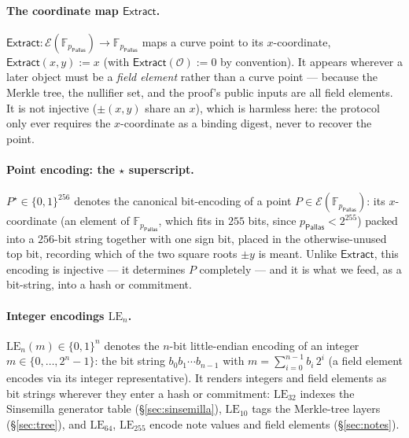 \documentclass[11pt,a4paper]{article}
\theoremstyle{definition}
\newcommand{\F}{\mathbb{F}}
\newcommand{\Pallas}{\ensuremath{\mathsf{Pallas}}}
\newcommand{\Ep}{\ensuremath{\mathcal{E}}}
\newcommand{\Extract}{\ensuremath{\mathsf{Extract}}}
\begin{document}
\paragraph{The coordinate map $\Extract$.}
$\Extract : \Ep(\F_{p_{\Pallas}}) \to \F_{p_{\Pallas}}$ maps a curve point
to its $x$-coordinate, $\Extract(x, y) := x$ (with
$\Extract(\mathcal{O}) := 0$ by convention). It appears wherever a later
object must be a \emph{field element} rather than a curve point --- because
the Merkle tree, the nullifier set, and the proof's public inputs are all
field elements. It is not injective ($\pm(x,y)$ share an $x$), which is
harmless here: the protocol only ever requires the $x$-coordinate as a binding
digest, never to recover the point.

\paragraph{Point encoding: the $\star$ superscript.}
$P^\star \in \{0,1\}^{256}$ denotes the canonical bit-encoding of a point
$P \in \Ep(\F_{p_{\Pallas}})$: its $x$-coordinate (an element of
$\F_{p_{\Pallas}}$, which fits in $255$ bits, since $p_{\Pallas} < 2^{255}$) packed
into a $256$-bit string together with one sign bit, placed in the otherwise-unused
top bit, recording which of the two square roots $\pm y$ is meant. Unlike $\Extract$,
this encoding is injective --- it determines $P$ completely --- and it is what
we feed, as a bit-string, into a hash or commitment.

\paragraph{Integer encodings $\mathrm{LE}_n$.}
$\mathrm{LE}_n(m) \in \{0,1\}^n$ denotes the $n$-bit little-endian encoding
of an integer $m \in \{0, \dots, 2^n - 1\}$: the bit string
$b_0 b_1 \cdots b_{n-1}$ with $m = \sum_{i=0}^{n-1} b_i\, 2^{i}$ (a field
element encodes via its integer representative). It renders integers and
field elements as bit strings wherever they enter a hash or commitment:
$\mathrm{LE}_{32}$ indexes the Sinsemilla generator table
(\S\ref{sec:sinsemilla}), $\mathrm{LE}_{10}$ tags the Merkle-tree layers
(\S\ref{sec:tree}), and $\mathrm{LE}_{64}$, $\mathrm{LE}_{255}$ encode note
values and field elements (\S\ref{sec:notes}).
\end{document}
